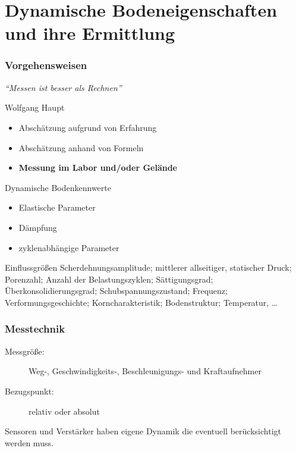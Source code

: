 \documentclass[hyperref={pdfpagemode=FullScreen, colorlinks=false}]{beamer}
\begin{document}
\maketitle


\section{Dynamische Bodeneigenschaften und ihre Ermittlung}

\begin{frame}
\frametitle{Vorgehensweisen}
\begin{center}
\Large
 \textsl{``Messen ist besser als Rechnen''}
\end{center}
\hfill Wolfgang Haupt \cite{haupt1986bodendynamik}

\vfill

\begin{itemize}
 \item Abschätzung aufgrund von Erfahrung
 \item Abschätzung anhand von Formeln
 \item \textbf{Messung im Labor und/oder Gelände}
\end{itemize}
\end{frame}


\begin{frame}
\begin{TUBAFinblock}{Dynamische Bodenkennwerte}
\begin{itemize}
        \item Elastische Parameter
        \item Dämpfung
        \item zyklenabhängige Parameter
\end{itemize}
\end{TUBAFinblock}

\begin{TUBAFinblock}{Einflussgrößen}
Scherdehnungsamplitude; mittlerer allseitiger, statischer Druck; Porenzahl; Anzahl der Belastungszyklen; Sättigungsgrad; Überkonsolidierungsgrad; Schubspannungszustand; Frequenz; Verformungsgeschichte; Korncharakteristik; Bodenstruktur; Temperatur,  \dots 
\end{TUBAFinblock}

\end{frame}


\begin{frame}
\frametitle{Messtechnik}

\begin{description}
 \item[Messgröße:] Weg-, Geschwindigkeits-, Beschleunigungs- und Kraftaufnehmer
 \item[Bezugspunkt:] relativ oder absolut
 \item[]
\end{description}
Sensoren und Verstärker haben eigene Dynamik die eventuell berücksichtigt werden muss.
\end{frame}
\end{document}
